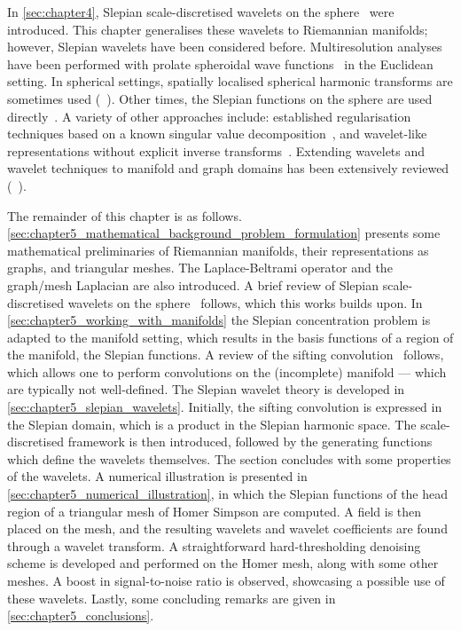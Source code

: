 In \cref{sec:chapter4}, Slepian scale-discretised wavelets on the sphere~\cite{Roddy2021a} were introduced.
This chapter generalises these wavelets to Riemannian manifolds; however, Slepian wavelets have been considered before.
Multiresolution analyses have been performed with prolate spheroidal wave functions~\cite{Walter2004} in the Euclidean setting.
In spherical settings, spatially localised spherical harmonic transforms are sometimes used (\eg{}~\cite{Simons1997,Wieczorek2005,Khalid2013,Khalid2013a}).
Other times, the Slepian functions on the sphere are used directly~\cite{Simons2009}.
A variety of other approaches include: established regularisation techniques based on a known singular value decomposition~\cite{Michel2017}, and wavelet-like representations without explicit inverse transforms~\cite{Simons2011}.
Extending wavelets and wavelet techniques to manifold and graph domains has been extensively reviewed (\eg{}~\cite{Dahmen1999,Coifman2006a}).

The remainder of this chapter is as follows.
\cref{sec:chapter5_mathematical_background_problem_formulation} presents some mathematical preliminaries of Riemannian manifolds, their representations as graphs, and triangular meshes.
The Laplace-Beltrami operator and the graph/mesh Laplacian are also introduced.
A brief review of Slepian scale-discretised wavelets on the sphere~\cite{Roddy2021a} follows, which this works builds upon.
In \cref{sec:chapter5_working_with_manifolds} the Slepian concentration problem is adapted to the manifold setting, which results in the basis functions of a region of the manifold, \ie{} the Slepian functions.
A review of the sifting convolution~\cite{Roddy2021} follows, which allows one to perform convolutions on the (incomplete) manifold --- which are typically not well-defined.
The Slepian wavelet theory is developed in \cref{sec:chapter5_slepian_wavelets}.
Initially, the sifting convolution is expressed in the Slepian domain, which is a product in the Slepian harmonic space.
The scale-discretised framework is then introduced, followed by the generating functions which define the wavelets themselves.
The section concludes with some properties of the wavelets.
A numerical illustration is presented in \cref{sec:chapter5_numerical_illustration}, in which the Slepian functions of the head region of a triangular mesh of Homer Simpson are computed.
A field is then placed on the mesh, and the resulting wavelets and wavelet coefficients are found through a wavelet transform.
A straightforward hard-thresholding denoising scheme is developed and performed on the Homer mesh, along with some other meshes.
A boost in signal-to-noise ratio is observed, showcasing a possible use of these wavelets.
Lastly, some concluding remarks are given in \cref{sec:chapter5_conclusions}.

